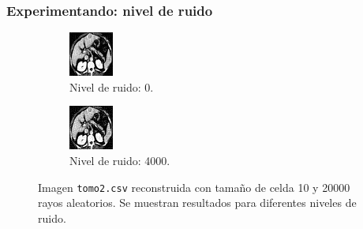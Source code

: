 \documentclass{beamer}
\begin{document}
\begin{frame}
\frametitle{Experimentando: nivel de ruido}

\begin{figure}
\centering
\begin{subfigure}{0.49\textwidth}
  \centering
  \includegraphics[width=0.6\linewidth]{ruido/tomo2-ruido0}
  \caption{Nivel de ruido: 0.}
\end{subfigure}
\begin{subfigure}{0.49\textwidth}
  \centering
  \includegraphics[width=0.6\linewidth]{ruido/tomo2-ruido4000}
  \caption{Nivel de ruido: 4000.}
\end{subfigure}
\caption{Imagen \texttt{tomo2.csv} reconstruida con tamaño de celda 10 y 20000 rayos aleatorios. Se 
muestran resultados para diferentes niveles de ruido.}
\label{fig:muestras_ruido}
\end{figure}

\end{frame}
\end{document}
